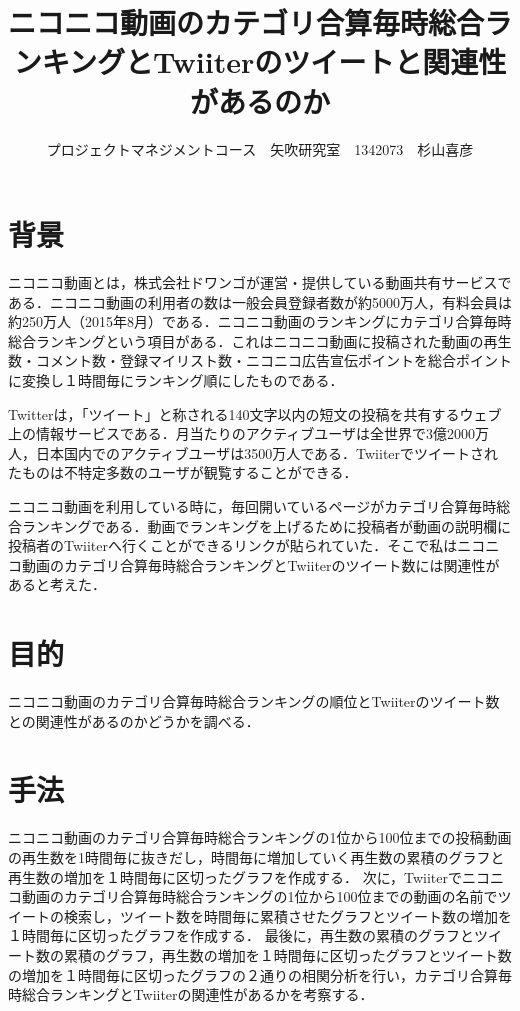 \documentclass[uplatex,twocolumn,dvipdfmx]{jsarticle}
\title{\vspace{-5mm}\fontsize{14pt}{0pt}\selectfont ニコニコ動画のカテゴリ合算毎時総合ランキングとTwiiterのツイートと関連性があるのか}
\author{\normalsize プロジェクトマネジメントコース　矢吹研究室　1342073　杉山喜彦}
\date{}
\begin{document}
\fontsize{10.5pt}{\baselineskip}\selectfont
\maketitle





\section{背景}


ニコニコ動画とは，株式会社ドワンゴが運営・提供している動画共有サービスである．ニコニコ動画の利用者の数は一般会員登録者数が約5000万人，有料会員は約250万人（2015年8月）である\cite{iii}．ニコニコ動画のランキングにカテゴリ合算毎時総合ランキングという項目がある．これはニコニコ動画に投稿された動画の再生数・コメント数・登録マイリスト数・ニコニコ広告宣伝ポイントを総合ポイントに変換し１時間毎にランキング順にしたものである．

Twitterは，「ツイート」と称される140文字以内の短文の投稿を共有するウェブ上の情報サービスである．月当たりのアクティブユーザは全世界で3億2000万人，日本国内でのアクティブユーザは3500万人である．Twiiterでツイートされたものは不特定多数のユーザが観覧することができる．

ニコニコ動画を利用している時に，毎回開いているページがカテゴリ合算毎時総合ランキングである．動画でランキングを上げるために投稿者が動画の説明欄に投稿者のTwiiterへ行くことができるリンクが貼られていた．そこで私はニコニコ動画のカテゴリ合算毎時総合ランキングとTwiiterのツイート数には関連性があると考えた．


\noindent



\section{目的}
ニコニコ動画のカテゴリ合算毎時総合ランキングの順位とTwiiterのツイート数との関連性があるのかどうかを調べる．

\section{手法}

ニコニコ動画のカテゴリ合算毎時総合ランキングの1位から100位までの投稿動画の再生数を1時間毎に抜きだし，時間毎に増加していく再生数の累積のグラフと再生数の増加を１時間毎に区切ったグラフを作成する．
次に，Twiiterでニコニコ動画のカテゴリ合算毎時総合ランキングの1位から100位までの動画の名前でツイートの検索し，ツイート数を時間毎に累積させたグラフとツイート数の増加を１時間毎に区切ったグラフを作成する．
最後に，再生数の累積のグラフとツイート数の累積のグラフ，再生数の増加を１時間毎に区切ったグラフとツイート数の増加を１時間毎に区切ったグラフの２通りの相関分析を行い，カテゴリ合算毎時総合ランキングとTwiiterの関連性があるかを考察する．
\end{document}
